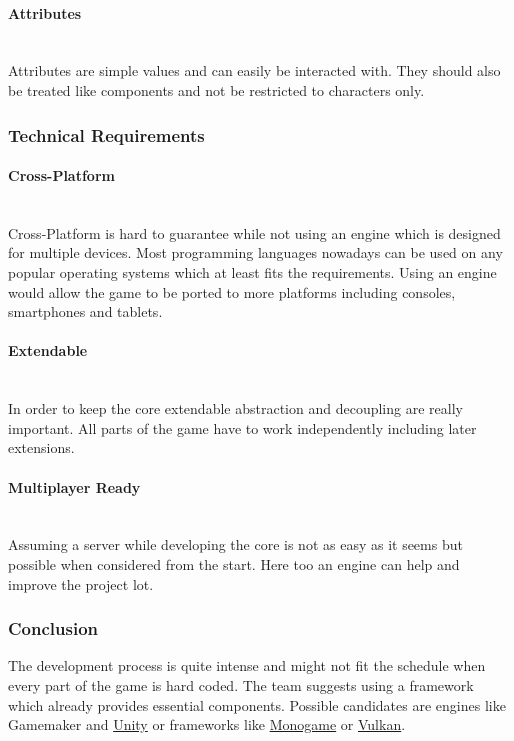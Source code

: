 \documentclass[11pt]{article}
\begin{document}
\paragraph{Attributes}~\\
Attributes are simple values and can easily be interacted with.
They should also be treated like components and not be restricted to characters only.

\subsubsection{Technical Requirements}
\paragraph{Cross-Platform}~\\
Cross-Platform is hard to guarantee while not using an engine which is designed for multiple devices. Most programming languages nowadays can be used on any popular operating systems which at least fits the requirements.
Using an engine would allow the game to be ported to more platforms including consoles, smartphones and tablets.
\paragraph{Extendable}~\\
In order to keep the core extendable abstraction and decoupling are really important. All parts of the game have to work independently including later extensions.
\paragraph{Multiplayer Ready}~\\
Assuming a server while developing the core is not as easy as it seems but possible when considered from the start.
Here too an engine can help and improve the project lot.

\subsubsection{Conclusion}
The development process is quite intense and might not fit the schedule when every part of the game is hard coded. The team suggests using a framework which already provides essential components.
Possible candidates are engines like Gamemaker and \hyperref[subsubsec:unity]{Unity} or frameworks like \hyperref[subsubsec:monogame]{Monogame} or \hyperref[subsubsec:vulkan]{Vulkan}.
\end{document}
